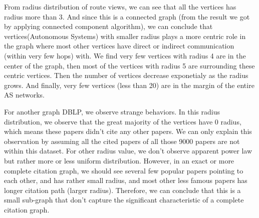 From radius distribution of route views, we can see that all the vertices has radius more than 3. And since this is a connected graph (from the result we got by applying connected component algorithm), we can conclude that vertices(Autonomous Systems) with smaller radius plays a more centric role in the graph where most other vertices have direct or indirect communication (within very few hops) with. We find very few vertices with radius 4 are in the center of the graph, then most of the vertices with radius 5 are surrounding these centric vertices. Then the number of vertices decrease exponetialy as the radius grows. And finally, very few vertices (less than 20) are in the margin of the entire AS networks.  

For another graph DBLP, we observe strange behaviors. In this radius distribution, we observe that the great majority of the vertices have 0 radius, which means these papers didn't cite any other papers. We can only explain this observation by assuming all the cited papers of all those 9000 papers are not within this dataset. For other radius value, we don't observe apparent power law but rather more or less uniform distribution. However, in an exact or more complete citation graph, we should see several few popular papers pointing to each other, and has rather small radius, and most other less famous papers has longer citation path (larger radius). Therefore, we can conclude that this is a small sub-graph that don't capture the significant characteristic of a complete citation graph.


